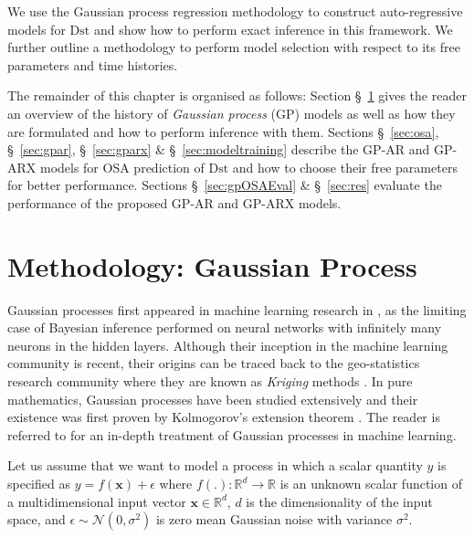 We use the Gaussian process regression methodology to construct auto-regressive models for 
$\mathrm{Dst}$ and show how to perform exact inference in this framework. We further outline a 
methodology to perform model selection with respect to its free parameters and time histories.

The remainder of this chapter is organised as follows: Section \S~\ref{sec:osaGPmethod} gives the 
reader an overview of the history of \emph{Gaussian process} (GP) models as well as how they are 
formulated and how to perform inference with them. Sections \S~\ref{sec:osa}, \S~\ref{sec:gpar}, 
\S~\ref{sec:gparx} \& \S~\ref{sec:modeltraining} describe the GP-AR and GP-ARX models for OSA 
prediction of $\mathrm{Dst}$ and how to choose their free parameters for better performance. 
Sections \S~\ref{sec:gpOSAEval} \& \S~\ref{sec:res} evaluate the performance of the proposed 
GP-AR and GP-ARX models.

\section{Methodology: Gaussian Process} \label{sec:osaGPmethod}

Gaussian processes first appeared in machine learning research in \citet{Neal:1996:BLN:525544}, 
as the limiting case of Bayesian inference performed on neural networks with infinitely many 
neurons in the hidden layers. Although their inception in the machine learning community is recent, 
their origins can be traced back to the geo-statistics research community where they are known as 
\emph{Kriging} methods \citep{krige1951statistical}. In pure mathematics, Gaussian processes have 
been studied extensively and their existence was first proven by Kolmogorov's extension theorem 
\citep{tao2011introduction}. The reader is referred to \citet{Rasmussen:2005:GPM:1162254} for an 
in-depth treatment of Gaussian processes in machine learning.

Let us assume that we want to model a process in which a scalar quantity $y$ is specified as 
$y = f(\mathbf{x}) + \epsilon$ where   $f(.): \mathbb{R}^d \rightarrow \mathbb{R}$ is an unknown 
scalar function of a multidimensional input vector $\mathbf{x} \in \mathbb{R}^d$, $d$ is the 
dimensionality of the input space, and $\epsilon \sim \mathcal{N}(0, \sigma^2)$ is zero mean 
Gaussian noise with variance $\sigma^2$.

